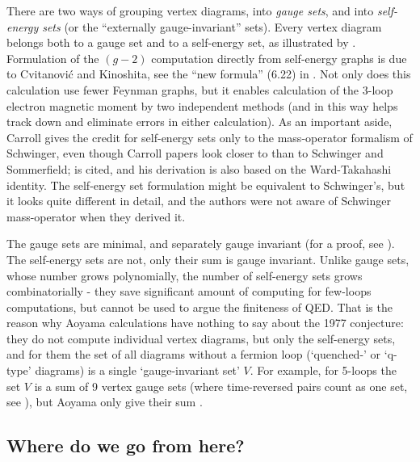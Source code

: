 There are two ways of grouping vertex diagrams, into \emph{gauge sets},
and into \emph{self-energy sets} (or the ``externally gauge-invariant''
sets). Every vertex diagram belongs both to a gauge set and to a
self-energy set, as illustrated by .
Formulation of the $(g-2)$ computation directly from self-energy graphs
is due to
{Cvitanovi\'{c} and Kinoshita}, see the ``new formula'' (6.22) in
. Not only does this calculation use fewer Feynman
graphs, but it enables calculation of the 3-loop electron magnetic moment
by two independent methods (and in this way helps track down and
eliminate errors in either calculation). As an important aside,
Carroll gives the credit for self-energy sets
only to the mass-operator formalism of Schwinger, even though Carroll papers
look closer to  than to Schwinger and Sommerfield;
 is cited, and his derivation is also based on the
Ward-Takahashi identity. The self-energy set
formulation might be equivalent to Schwinger's, but it looks quite
different in detail, and the authors were not aware of Schwinger
mass-operator when they derived it.

The gauge sets are minimal, and separately gauge invariant (for a proof,
see ). The self-energy sets are not, only their sum is
gauge invariant.
Unlike gauge sets, whose number grows polynomially, the number of
self-energy sets grows combinatorially - they save significant amount
of computing for few-loops computations, but cannot be used to argue the
finiteness of QED.
That is the reason why Aoyama \etal{}
calculations have nothing to say about the 1977 conjecture:
they do not compute individual vertex diagrams, but only the self-energy
sets, and for them the set of all diagrams without a fermion loop
(`quenched-' or `q-type' diagrams) is a single `gauge-invariant set'
$V$. For example, for 5-loops the set $V$ is a sum of 9 vertex gauge sets
(where time-reversed pairs count as one set, see ),
but Aoyama \etal{} only give their sum .

\subsection{Where do we go from here?}
\label{sect:future}

